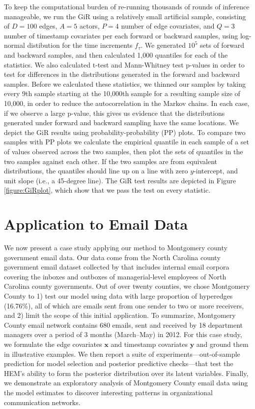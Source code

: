 \documentclass[ba]{imsart}
\numberwithin{equation}{section}
\theoremstyle{plain}
\begin{document}
   To keep the computational burden of re-running thousands of rounds of inference manageable, we run the GiR using a relatively small artificial sample, consisting of $D=100$ edges, $A=5$ actors, $P=4$ number of edge covariates, and $Q=3$ number of timestamp covariates per each forward or backward samples, using log-normal distibution for the time increments $f_\tau$. We generated $10^5$ sets of forward and backward samples, and then calculated 1,000 quantiles for each of the statistics. We also calculated t-test and Mann-Whitney test p-values in order to test for differences in the distributions generated in the forward and backward samples. Before we calculated these statistics, we thinned our samples by taking every 9th sample starting at the 10,000th sample for a resulting sample size of 10,000, in order to reduce the autocorrelation in the Markov chains. In each case, if we observe a large p-value, this gives us evidence that the distributions generated under forward and backward sampling have the same locations. We depict the GiR results using probability-probability (PP) plots. To compare two samples with PP plots we calculate the empirical quantile in each sample of a set of values observed across the two samples, then plot the sets of quantiles in the two samples against each other. If the two samples are from equivalent distributions, the quantiles should line up on a line with zero $y$-intercept, and unit slope (i.e., a 45-degree line). The GiR test results are depicted in Figure \ref{figure:GiRplot}, which show that we pass the test on every statistic.

 	   \section{Application to Email Data}\label{sec:Emails}
 	   We now present a case study applying our method to Montgomery county government email data.
 	   Our data come from the North Carolina county government email dataset collected by \cite{ben2017transparency} that includes internal email corpora covering the inboxes and outboxes of managerial-level employees of North Carolina county governments. Out of over twenty counties, we chose Montgomery County to 1) test our model using data with large proportion of hyperedges (16.76\%), all of which are emails sent from one sender to two or more receivers, and 2) limit the scope of this initial application. To summarize, Montgomery County email network contains 680 emails, sent and received by 18 department managers over a period of 3 months (March--May) in 2012. For this case study,
 	   we formulate the edge covariates $\boldsymbol{x}$ and timestamp covariates $\boldsymbol{y}$ and ground them in illustrative examples. We then report a suite of experiments---out-of-sample prediction for model selection and posterior predictive checks---that test the HEM's ability to form the posterior distribution over its latent variables. Finally, we demonstrate an exploratory analysis of Montgomery County email data using the model estimates to discover interesting patterns in organizational communication networks.
\end{document}
